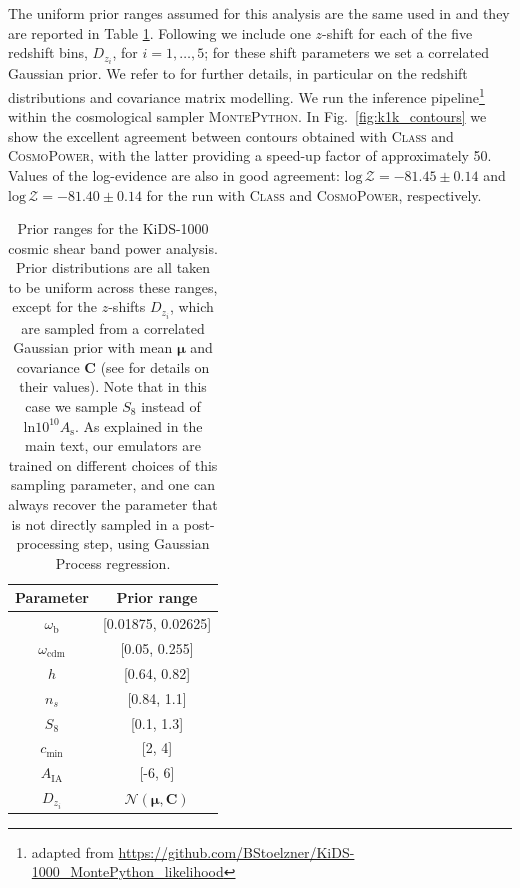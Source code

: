 \documentclass[fleqn,usenatbib]{mnras}
\begin{document}
The uniform prior ranges assumed for this analysis are the same used in \citet{Asgari20} and they are reported in Table \ref{tab:prior_kids1000}. Following \citet{Asgari20} we include one $z$-shift for each of the five redshift bins, $D_{z_i}$, for $i = 1, \dots, 5$; for these shift parameters we set a correlated Gaussian prior. We refer to \citep{Asgari20, Joachimi20} for further details, in particular on the redshift distributions and covariance matrix modelling. We run the inference pipeline\footnote{adapted from \url{https://github.com/BStoelzner/KiDS-1000_MontePython_likelihood}} within the cosmological sampler \textsc{MontePython}. In Fig.~\ref{fig:k1k_contours} we show the excellent agreement between contours obtained with \textsc{Class} and \textsc{CosmoPower}, with the latter providing a speed-up factor of approximately 50. Values of the log-evidence are also in good agreement: $\mathrm{log} \, \mathcal{Z} = -81.45 \pm 0.14$ and $\mathrm{log} \, \mathcal{Z} = -81.40 \pm 0.14$ for the run with \textsc{Class} and \textsc{CosmoPower}, respectively.
\begin{table}
  \centering 
  \begin{tabular}{c|c}
    \textbf{Parameter}               &  \textbf{Prior range} \\
    \hline
    \hline
    $\omega_{\mathrm{b}}$   & [0.01875, 0.02625] \\
    \hline
    $\omega_{\mathrm{cdm}}$ & [0.05, 0.255]      \\
    \hline
    $h$                     & [0.64, 0.82]       \\
    \hline
    $n_s$                   & [0.84, 1.1]        \\
    \hline
    $S_8$                   & [0.1, 1.3]           \\
    \hline
    $c_{\mathrm{min}}$      & [2, 4]           \\
    \hline
    $A_{\mathrm{IA}}$       & [-6, 6]          \\
    \hline
    $D_{z_i}$               & $\mathcal{N}(\boldsymbol{\mu}, \boldsymbol{C})$          \\
    \hline
    \hline
    \end{tabular}
   \caption{Prior ranges for the KiDS-1000 cosmic shear band power analysis. Prior distributions are all taken to be uniform across these ranges, except for the $z$-shifts $D_{z_i}$, which are sampled from a correlated Gaussian prior with mean $\boldsymbol{\mu}$ and covariance $\boldsymbol{C}$ (see \citealt{Asgari20} for details on their values). Note that in this case we sample $S_8$ instead of $\mathrm{ln}10^{10}A_{\mathrm{s}}$. As explained in the main text, our emulators are trained on different choices of this sampling parameter, and one can always recover the parameter that is not directly sampled in a post-processing step, using Gaussian Process regression.}
  \label{tab:prior_kids1000}
\end{table}
\end{document}

